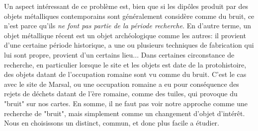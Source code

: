 \documentclass[a4paper, 12pt, titlepage, oneside, french]{article}
\begin{document}
Un aspect intéressant de ce problème est, bien que si les dipôles produit par des objets métalliques contemporains sont généralement considère comme du bruit, ce n'est parce qu'ils \textit{ne font pas partie de la période recherche}. En d'autre terme, un objet métallique récent est un objet archéologique comme les autres: il provient d'une certaine période historique, a une ou plusieurs techniques de fabrication qui lui sont propre, provient d'un certains lieu... Dans certaines circonstance de recherche, en particulier lorsque le site et les objets est date de la protohistoire, des objets datant de l'occupation romaine sont vu comme du bruit. C'est le cas avec le site de Marsal, ou une occupation romaine a eu pour conséquence des rejets de déchets datant de l'ère romaine, comme des tuiles, qui provoque du "bruit" sur nos cartes. En somme, il ne faut pas voir notre approche comme une recherche de "bruit", mais simplement comme un changement d'objet d'intérêt. Nous en choisissons un distinct, commun, et donc plus facile a étudier.
\end{document}
